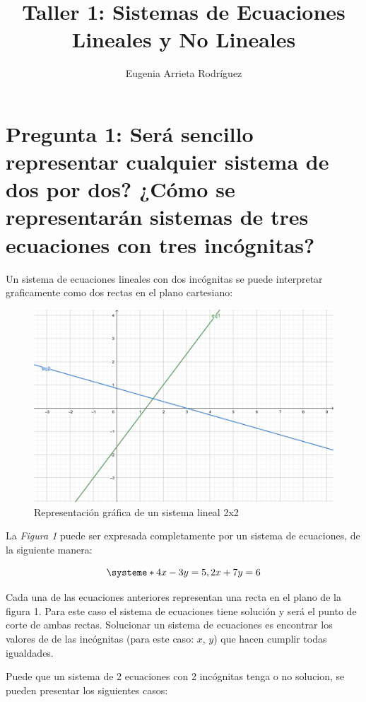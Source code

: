 \documentclass[a4paper, apacite, 12pt, doc]{apa6}
\title{ Taller 1: Sistemas de Ecuaciones Lineales y No Lineales}
\author{Eugenia Arrieta Rodríguez}
\affiliation{Universidad de la Costa}
\begin{document}
\maketitle

\section{Pregunta 1:  Será sencillo representar cualquier sistema de dos por dos? ¿Cómo se representarán sistemas de tres ecuaciones con tres incógnitas?}


Un sistema de  ecuaciones lineales con dos incógnitas se puede interpretar graficamente como dos rectas en el plano cartesiano:


\begin{figure}[h]
	\centering
	\includegraphics[scale=0.9]{img01}
	\caption{Representación gráfica de un sistema lineal 2x2}
\end{figure}

La \textit{Figura 1} puede ser expresada completamente por un sistema de ecuaciones, de la siguiente manera:

\[
\systeme*{4x -3y = 5, 2x + 7y = 6}
\]

Cada una de las ecuaciones anteriores representan una recta en el plano de la figura 1. Para este caso el sistema de ecuaciones tiene solución y será el punto de corte de ambas rectas. Solucionar un sistema de ecuaciones es encontrar los valores de de las incógnitas (para este caso: $x$, $y$) que hacen cumplir todas igualdades.

 Puede que un sistema de 2 ecuaciones con 2 incógnitas tenga o no solucion, se pueden presentar los siguientes casos:
\end{document}
